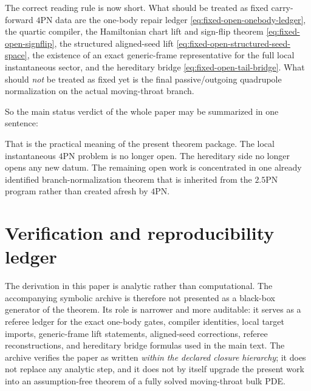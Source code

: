 \documentclass[11pt]{article}
\begin{document}
The correct reading rule is now short.  What should be treated as fixed
carry-forward $4$PN data are the one-body repair ledger
\eqref{eq:fixed-open-onebody-ledger}, the quartic compiler, the Hamiltonian
chart lift and sign-flip theorem \eqref{eq:fixed-open-signflip}, the structured
aligned-seed lift \eqref{eq:fixed-open-structured-seed-space}, the existence of
an exact generic-frame representative for the full local instantaneous sector,
and the hereditary bridge \eqref{eq:fixed-open-tail-bridge}.  What should \emph{not}
be treated as fixed yet is the final passive/outgoing quadrupole normalization on
the actual moving-throat branch.

So the main status verdict of the whole paper may be summarized in one sentence:
\begin{center}
\end{center}

That is the practical meaning of the present theorem package.  The local
instantaneous $4$PN problem is no longer open.  The hereditary side no longer
opens any new datum.  The remaining open work is concentrated in one already
identified branch-normalization theorem that is inherited from the $2.5$PN
program rather than created afresh by $4$PN.


\section{Verification and reproducibility ledger}
\label{sec:verification}

The derivation in this paper is analytic rather than computational.  The
accompanying symbolic archive is therefore not presented as a black-box generator
of the theorem.  Its role is narrower and more auditable: it serves as a referee
ledger for the exact one-body gates, compiler identities, local target imports,
generic-frame lift statements, aligned-seed corrections, referee reconstructions,
and hereditary bridge formulas used in the main text.  The archive verifies the
paper as written \emph{within the declared closure hierarchy}; it does not
replace any analytic step, and it does not by itself upgrade the present work
into an assumption-free theorem of a fully solved moving-throat bulk PDE.
\end{document}
